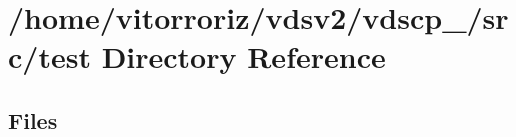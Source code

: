\section{/home/vitorroriz/vdsv2/vdscp\+\_/src/test Directory Reference}
\label{dir_120ed4da3e3217b1e7fc0b4f48568e79}
\subsection*{Files}
\begin{DoxyCompactItemize}
\end{DoxyCompactItemize}

